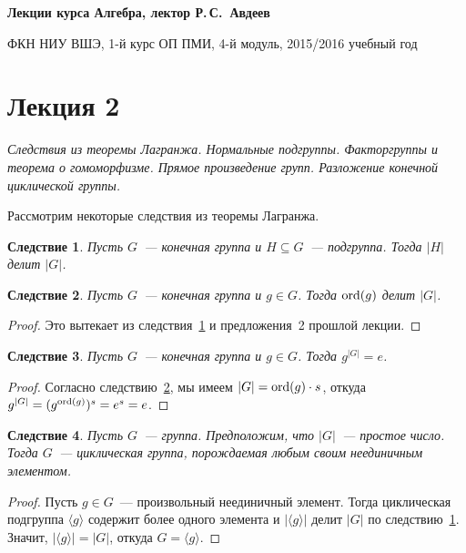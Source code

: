 \documentclass[a4paper,10pt]{amsart}
\def\ord{{\rm ord}}%
\def\ord{{\rm ord}}
\def\ord{{\rm ord}}
\newtheorem{corollary}{Следствие}
\theoremstyle{definition}
\theoremstyle{remark}
\begin{document}
%
\sloppy
%
\centerline{\large \bf Лекции курса \guillemotleft
Алгебра\guillemotright{}, лектор Р.\,С.~Авдеев}

\smallskip

\centerline{\large ФКН НИУ ВШЭ, 1-й курс ОП ПМИ, 4-й модуль,
2015/2016 учебный год}


\bigskip

\section*{Лекция 2}

\medskip

{\it Следствия из теоремы Лагранжа. Нормальные подгруппы. Факторгруппы и теорема о гомоморфизме. Прямое произведение групп. Разложение конечной циклической группы.}

\medskip

Рассмотрим некоторые следствия из теоремы Лагранжа.

\begin{corollary} \label{c1}
Пусть $G$~--- конечная группа и $H\subseteq G$~--- подгруппа. Тогда
$|H|$ делит $|G|$.
\end{corollary}

\begin{corollary} \label{c2}
Пусть $G$~--- конечная группа и $g\in G$. Тогда $\ord(g)$ делит
$|G|$.
\end{corollary}

\begin{proof}
Это вытекает из следствия~\ref{c1} и предложения~2 прошлой лекции.
\end{proof}

\begin{corollary} \label{c3}
Пусть $G$~--- конечная группа и $g\in G$. Тогда $g^{|G|}=e$.
\end{corollary}

\begin{proof}
Согласно следствию~\ref{c2}, мы имеем $|G|=\ord(g) \cdot s$, откуда
$g^{|G|}=(g^{\ord(g)})^s=e^s=e$.
\end{proof}

\begin{corollary} \label{c5}
Пусть $G$~--- группа. Предположим, что $|G|$~--- простое число.
Тогда $G$~--- циклическая группа, порождаемая любым своим
неединичным элементом.
\end{corollary}

\begin{proof}
Пусть $g\in G$~--- произвольный неединичный элемент. Тогда
циклическая подгруппа $\langle g\rangle$ содержит более одного
элемента и $|\langle g\rangle|$ делит $|G|$ по следствию~\ref{c1}.
Значит, $|\langle g\rangle|=|G|$, откуда $G=\langle g\rangle$.
\end{proof}
\end{document}
